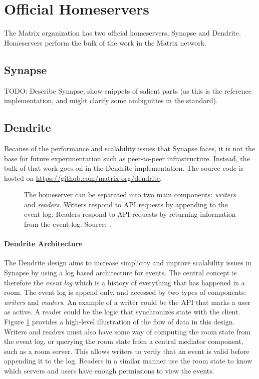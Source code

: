 \section{Official Homeservers}
The Matrix organization has two official homeservers, Synapse\cite{matrix_org_synapse} and Dendrite\cite{matrix_org_dendrite}.
Homeservers perform the bulk of the work in the Matrix network.

\subsection{Synapse}
TODO:
    Describe Synapse, show snippets of salient parts (as this is the reference implementation, and might clarify some ambiguities in the standard).

\subsection{Dendrite}
Because of the performance and scalability issues that Synapse faces, it is not the base for future experimentation such as peer-to-peer infrastructure.
Instead, the bulk of that work goes on in the Dendrite implementation.
The source code is hosted on \url{https://github.com/matrix-org/dendrite}.

\begin{figure}
    \centering
    \resizebox{0.9\linewidth}{!}{}
    \caption{
        The homeserver can be separated into two main components: \textit{writers} and \textit{readers}.
        Writers respond to API requests by appending to the event log.
        Readers respond to API requests by returning information from the event log.
        Source: \cite{dendrite_design_md}.
    }
    \label{fig:dendrite_design}
\end{figure}

\paragraph{Dendrite Architecture}
The Dendrite design aims to increase simplicity and improve scalability issues in Synapse by using a log based architecture for events.
The central concept is therefore the \textit{event log} which is a history of everything that has happened in a room.
The event log is append only, and accessed by two types of components: \textit{writers} and \textit{readers}.
An example of a writer could be the API that marks a user as active.
A reader could be the logic that synchronizes state with the client.
Figure \ref{fig:dendrite_design} provides a high-level illustration of the flow of data in this design.
Writers and readers must also have some way of computing the room state from the event log, or querying the room state from a central mediator component, such as a room server.
This allows writers to verify that an event is valid before appending it to the log.
Readers in a similar manner use the room state to know which servers and users have enough permissions to view the events.

